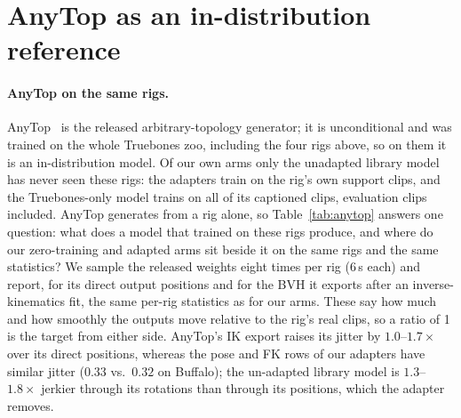 \section{AnyTop as an in-distribution reference}\label{app:anytop}

\paragraph{AnyTop on the same rigs.} AnyTop~\citep{gat2025anytop} is the
released arbitrary-topology generator; it is unconditional and was trained on the whole Truebones
zoo, including the four rigs above, so on them it is an in-distribution model. Of our own arms only
the unadapted library model has never seen these rigs: the adapters train on the rig's own support
clips, and the Truebones-only model trains on all of its captioned clips, evaluation clips included.
AnyTop generates from a rig alone, so Table~\ref{tab:anytop} answers one question: what does a model
that trained on these rigs produce, and where do our zero-training and adapted arms sit beside it on the same
rigs and the same statistics? We sample the released weights eight times per rig
(6\,s each) and report, for its direct output positions and for the BVH it exports after an
inverse-kinematics fit, the same per-rig statistics as for our arms. These say how much and how smoothly the outputs move
relative to the rig's real clips, so a ratio of 1 is the target from either side. AnyTop's IK export raises its jitter by $1.0$--$1.7{\times}$
over its direct positions, whereas the pose and FK rows of our adapters have similar jitter
($0.33$ vs.\ $0.32$ on Buffalo); the un-adapted library model is $1.3$--$1.8{\times}$
jerkier through its rotations than through its positions, which the adapter removes.

